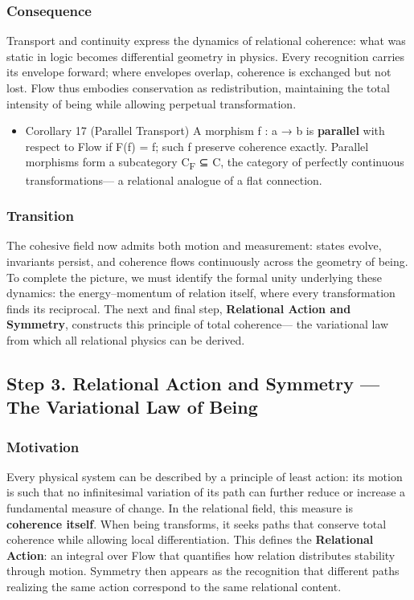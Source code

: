 \documentclass[11pt]{article}
\begin{document}
\subsubsection*{Consequence}
\label{sec:org0681b0a}
Transport and continuity express the dynamics of relational coherence:  
what was static in logic becomes differential geometry in physics.  
Every recognition carries its envelope forward;  
where envelopes overlap, coherence is exchanged but not lost.  
Flow thus embodies conservation as redistribution,  
maintaining the total intensity of being while allowing perpetual transformation.
\begin{itemize}
\item Corollary 17 (Parallel Transport)
\label{sec:org9d79978}
A morphism f : a → b is \textbf{parallel} with respect to Flow  
if F(f) = f; such f preserve coherence exactly.  
Parallel morphisms form a subcategory C\textsubscript{F} ⊆ C,  
the category of perfectly continuous transformations—  
a relational analogue of a flat connection.
\end{itemize}
\subsubsection*{Transition}
\label{sec:org4574ba0}
The cohesive field now admits both motion and measurement:  
states evolve, invariants persist, and coherence flows continuously across the geometry of being.  
To complete the picture, we must identify the formal unity underlying these dynamics:  
the energy–momentum of relation itself, where every transformation finds its reciprocal.  
The next and final step, \textbf{Relational Action and Symmetry}, constructs this principle of total coherence—  
the variational law from which all relational physics can be derived.
\subsection*{Step 3. Relational Action and Symmetry — The Variational Law of Being}
\label{sec:org90290ef}

\subsubsection*{Motivation}
\label{sec:org59ddbe0}
Every physical system can be described by a principle of least action:  
its motion is such that no infinitesimal variation of its path can further reduce or increase a fundamental measure of change.  
In the relational field, this measure is \textbf{coherence itself}.  
When being transforms, it seeks paths that conserve total coherence while allowing local differentiation.  
This defines the \textbf{Relational Action}: an integral over Flow that quantifies how relation distributes stability through motion.  
Symmetry then appears as the recognition that different paths realizing the same action correspond to the same relational content.
\end{document}
